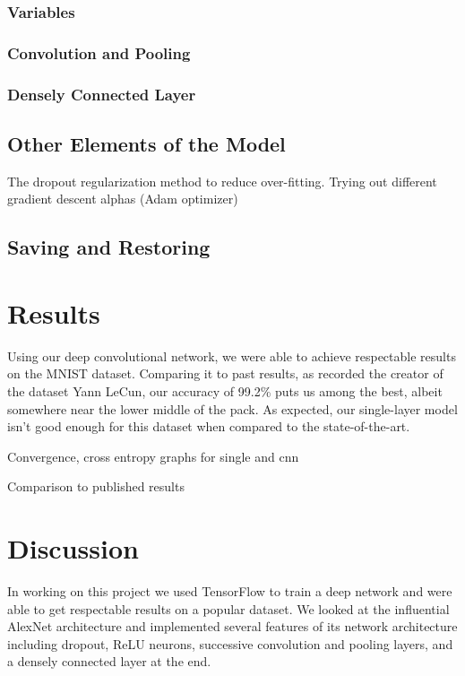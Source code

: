 \documentclass{article}
\begin{document}
\subsubsection{Variables}
\subsubsection{Convolution and Pooling}
\subsubsection{Densely Connected Layer}

\subsection{Other Elements of the Model}

The dropout regularization method to reduce over-fitting.
Trying out different gradient descent alphas (Adam optimizer)

\subsection{Saving and Restoring}


\section{Results}

Using our deep convolutional network, we were able to achieve respectable results on the MNIST dataset. Comparing it to past results, as recorded  the creator of the dataset Yann LeCun, our accuracy of 99.2\% puts us among the best, albeit somewhere near the lower middle of the pack. As expected, our single-layer model isn't good enough for this dataset when compared to the state-of-the-art.

Convergence, cross entropy graphs for single and cnn

Comparison to published results

\section{Discussion}

In working on this project we used TensorFlow to train a deep network and were able to get respectable results on a popular dataset. We looked at the influential AlexNet architecture and implemented several features of its network architecture including dropout, ReLU neurons, successive convolution and pooling layers, and a densely connected layer at the end. 
\end{document}
